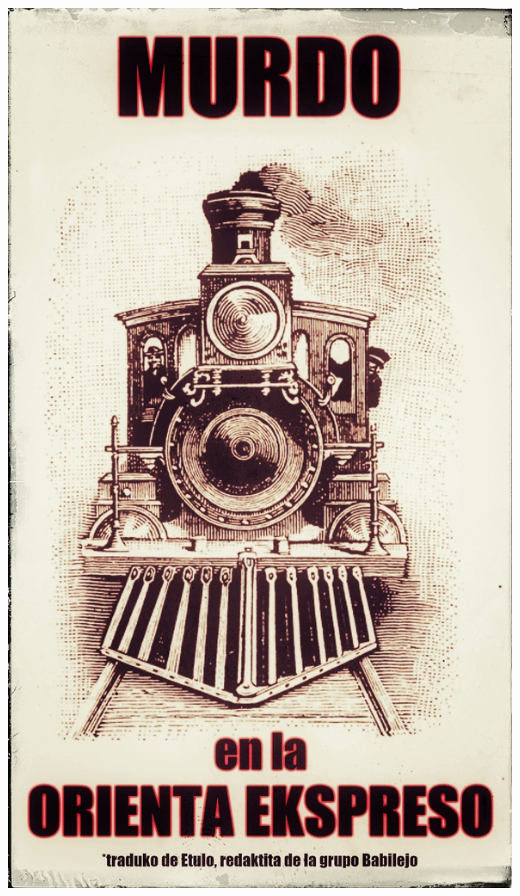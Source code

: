 
\def\mytitle{Murdo en la Orienta Ekspreso}
\def\myauthor{Agatha Christie}
\def\mycopyright{Copyright 2021, Agatha Christie. All rights reserved.}



    \begin{center}
    \includegraphics[width=\textwidth,height=\textheight]{cover.jpg} 
	\end{center}
\thispagestyle{empty}
\clearpage
\vspace*{-4em}
\tableofcontents*
\thispagestyle{empty}
\mainmatter
\setcounter{page}{3}

